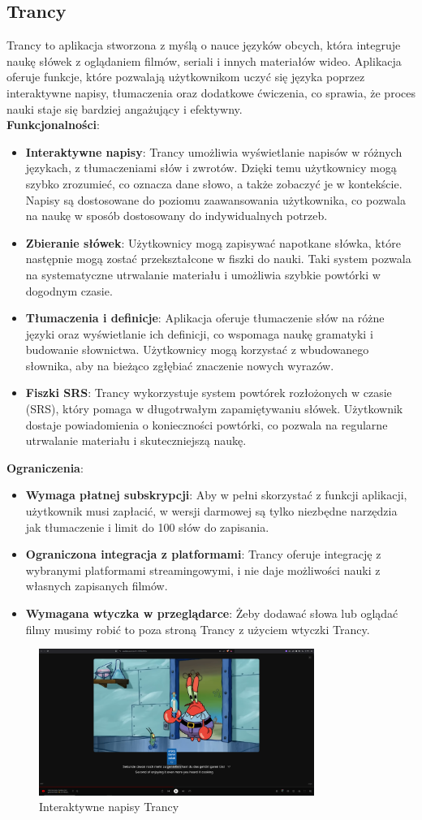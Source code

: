 \subsection{Trancy}
Trancy to aplikacja stworzona z myślą o nauce języków obcych, która integruje naukę słówek z oglądaniem filmów, seriali i innych materiałów wideo. Aplikacja oferuje funkcje, które pozwalają użytkownikom uczyć się języka poprzez interaktywne napisy, tłumaczenia oraz dodatkowe ćwiczenia, co sprawia, że proces nauki staje się bardziej angażujący i efektywny. \\
\textbf{Funkcjonalności}:
\begin{itemize}
    \item \textbf{Interaktywne napisy}: Trancy umożliwia wyświetlanie napisów w różnych językach, z tłumaczeniami słów i zwrotów. Dzięki temu użytkownicy mogą szybko zrozumieć, co oznacza dane słowo, a także zobaczyć je w kontekście. Napisy są dostosowane do poziomu zaawansowania użytkownika, co pozwala na naukę w sposób dostosowany do indywidualnych potrzeb.
    \item \textbf{Zbieranie słówek}: Użytkownicy mogą zapisywać napotkane słówka, które następnie mogą zostać przekształcone w fiszki do nauki. Taki system pozwala na systematyczne utrwalanie materiału i umożliwia szybkie powtórki w dogodnym czasie.
    \item \textbf{Tłumaczenia i definicje}: Aplikacja oferuje tłumaczenie słów na różne języki oraz wyświetlanie ich definicji, co wspomaga naukę gramatyki i budowanie słownictwa. Użytkownicy mogą korzystać z wbudowanego słownika, aby na bieżąco zgłębiać znaczenie nowych wyrazów.
    \item \textbf{Fiszki SRS}: Trancy wykorzystuje system powtórek rozłożonych w czasie (SRS), który pomaga w długotrwałym zapamiętywaniu słówek. Użytkownik dostaje powiadomienia o konieczności powtórki, co pozwala na regularne utrwalanie materiału i skuteczniejszą naukę.
\end{itemize}
\textbf{Ograniczenia}:
\begin{itemize}
    \item \textbf{Wymaga płatnej subskrypcji}: Aby w pełni skorzystać z funkcji aplikacji, użytkownik musi zapłacić, w wersji darmowej są tylko niezbędne narzędzia jak tłumaczenie i limit do 100 słów do zapisania.
    \item \textbf{Ograniczona integracja z platformami}: Trancy oferuje integrację z wybranymi platformami streamingowymi, i nie daje możliwości nauki z własnych zapisanych filmów.
    \item \textbf{Wymagana wtyczka w przeglądarce}: Żeby dodawać słowa lub oglądać filmy musimy robić to poza stroną Trancy z użyciem wtyczki Trancy.
\end{itemize}

\begin{figure}[H]
    \centering
    \includegraphics[width=0.8\textwidth]{IMAGE/Trancy.png}
    \caption{Interaktywne napisy Trancy}
    \label{fig:Trancy}
\end{figure}